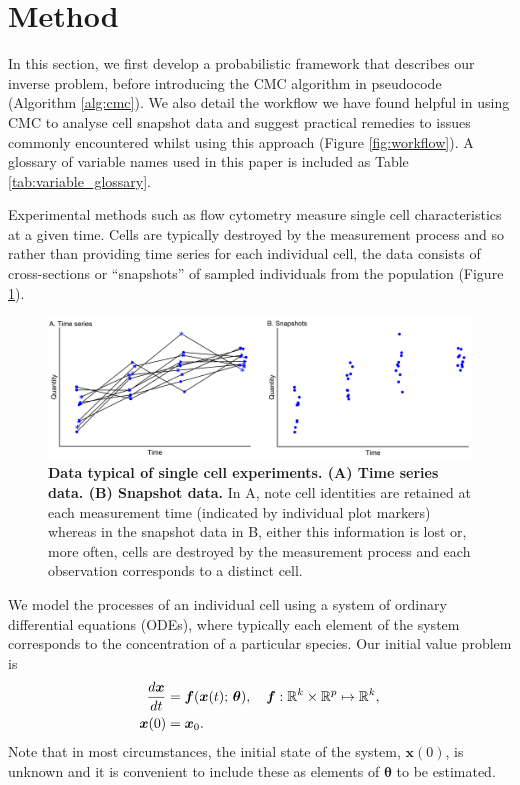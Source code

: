 \section{Method}\label{sec:method}
In this section, we first develop a probabilistic framework that describes our inverse problem, before introducing the CMC algorithm in pseudocode (Algorithm \ref{alg:cmc}). We also detail the workflow we have found helpful in using CMC to analyse cell snapshot data and suggest practical remedies to issues commonly encountered whilst using this approach (Figure \ref{fig:workflow}). A glossary of variable names used in this paper is included as Table \ref{tab:variable_glossary}.

Experimental methods such as flow cytometry measure single cell characteristics at a given time. Cells are typically destroyed by the measurement process and so rather than providing time series for each individual cell, the data consists of cross-sections or ``snapshots'' of sampled individuals from the population (Figure \ref{fig:time_series_v_snapshots}).

\begin{figure}[H]
  \centerline{\includegraphics[width=\textwidth]{../figures/time_series_v_snapshots.pdf}}
  \caption{\textbf{Data typical of single cell experiments. (A) Time series data. (B) Snapshot data.} In A, note cell identities are retained at each measurement time (indicated by individual plot markers) whereas in the snapshot data in B, either this information is lost or, more often, cells are destroyed by the measurement process and each observation corresponds to a distinct cell.}
  \label{fig:time_series_v_snapshots}
\end{figure}

We model the processes of an individual cell using a system of ordinary differential equations (ODEs), where typically each element of the system corresponds to the concentration of a particular species. Our initial value problem is
%
\begin{equation}\label{eq:ode}
\begin{aligned}
\frac{d\boldsymbol{x}}{dt} &= \boldsymbol{f}(\boldsymbol{x}(t); \, \boldsymbol{\theta}), \quad \boldsymbol{f}: \mathbb{R}^k \times \mathbb{R}^p \mapsto \mathbb{R}^k, \\
\boldsymbol{x}(0) &= \boldsymbol{x}_0.
\end{aligned}
\end{equation}
%
Note that in most circumstances, the initial state of the system, $\boldsymbol{x}(0)$, is unknown and it is convenient to include these as elements of $\boldsymbol{\theta}$ to be estimated.

